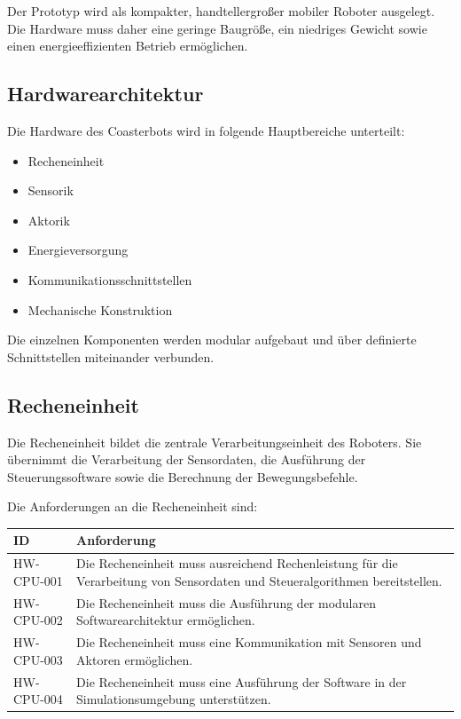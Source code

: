 \documentclass[
  a4paper,
  12pt,
  DIV=12,        %
  parskip=half,  %
  headings=small %
]{scrartcl}
\theoremstyle{definition}
\providecommand{\tightlist}{%
  \setlength{\itemsep}{0pt}\setlength{\parskip}{0pt}}
\theoremstyle{definition}
\begin{document}
Der Prototyp wird als kompakter, handtellergroßer mobiler Roboter
ausgelegt. Die Hardware muss daher eine geringe Baugröße, ein niedriges
Gewicht sowie einen energieeffizienten Betrieb ermöglichen.

\subsection{Hardwarearchitektur}\label{hardwarearchitektur}

Die Hardware des Coasterbots wird in folgende Hauptbereiche unterteilt:

\begin{itemize}
\tightlist
\item
  Recheneinheit
\item
  Sensorik
\item
  Aktorik
\item
  Energieversorgung
\item
  Kommunikationsschnittstellen
\item
  Mechanische Konstruktion
\end{itemize}

Die einzelnen Komponenten werden modular aufgebaut und über definierte
Schnittstellen miteinander verbunden.

\subsection{Recheneinheit}\label{recheneinheit}

Die Recheneinheit bildet die zentrale Verarbeitungseinheit des Roboters.
Sie übernimmt die Verarbeitung der Sensordaten, die Ausführung der
Steuerungssoftware sowie die Berechnung der Bewegungsbefehle.

Die Anforderungen an die Recheneinheit sind:

\begin{longtable}[]{@{}
  >{\raggedright\arraybackslash}p{}
  >{\raggedright\arraybackslash}p{}@{}}
\toprule\noalign{}
\begin{minipage}[b]{\linewidth}\raggedright
ID
\end{minipage} & \begin{minipage}[b]{\linewidth}\raggedright
Anforderung
\end{minipage} \\
\midrule\noalign{}
\endhead
\bottomrule\noalign{}
\endlastfoot
HW-CPU-001 & Die Recheneinheit muss ausreichend Rechenleistung für die
Verarbeitung von Sensordaten und Steueralgorithmen bereitstellen. \\
HW-CPU-002 & Die Recheneinheit muss die Ausführung der modularen
Softwarearchitektur ermöglichen. \\
HW-CPU-003 & Die Recheneinheit muss eine Kommunikation mit Sensoren und
Aktoren ermöglichen. \\
HW-CPU-004 & Die Recheneinheit muss eine Ausführung der Software in der
Simulationsumgebung unterstützen. \\
\end{longtable}
\end{document}
